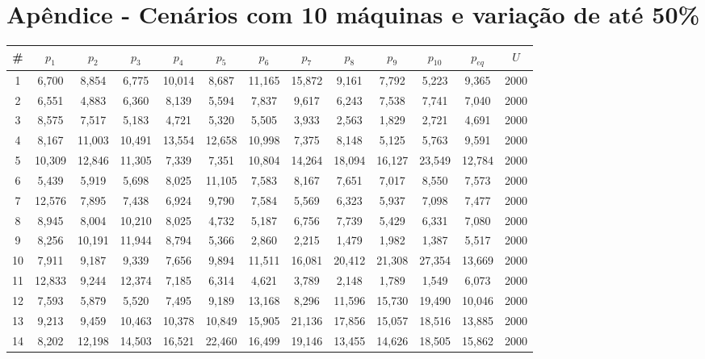 
\newpage
\section{Apêndice - Cenários com 10 máquinas e variação de até 50\%}\label{app:tab10machine50}
{\footnotesize\tabcolsep=3pt %
\begin{longtable}{ >{\footnotesize}ccccccccccccc}
\hline
\#  & $p_1$     & $p_2$     & $p_3$     & $p_4$     & $p_5$     & $p_6$     & $p_7$     & $p_8$     & $p_9$     & $p_{10}$    & $p_{eq}$    & $U$    \\ \hline
1   & 6,700  & 8,854  & 6,775  & 10,014 & 8,687  & 11,165 & 15,872 & 9,161  & 7,792  & 5,223  & 9,365  & 2000 \\
2   & 6,551  & 4,883  & 6,360  & 8,139  & 5,594  & 7,837  & 9,617  & 6,243  & 7,538  & 7,741  & 7,040  & 2000 \\
3   & 8,575  & 7,517  & 5,183  & 4,721  & 5,320  & 5,505  & 3,933  & 2,563  & 1,829  & 2,721  & 4,691  & 2000 \\
4   & 8,167  & 11,003 & 10,491 & 13,554 & 12,658 & 10,998 & 7,375  & 8,148  & 5,125  & 5,763  & 9,591  & 2000 \\
5   & 10,309 & 12,846 & 11,305 & 7,339  & 7,351  & 10,804 & 14,264 & 18,094 & 16,127 & 23,549 & 12,784 & 2000 \\
6   & 5,439  & 5,919  & 5,698  & 8,025  & 11,105 & 7,583  & 8,167  & 7,651  & 7,017  & 8,550  & 7,573  & 2000 \\
7   & 12,576 & 7,895  & 7,438  & 6,924  & 9,790  & 7,584  & 5,569  & 6,323  & 5,937  & 7,098  & 7,477  & 2000 \\
8   & 8,945  & 8,004  & 10,210 & 8,025  & 4,732  & 5,187  & 6,756  & 7,739  & 5,429  & 6,331  & 7,080  & 2000 \\
9   & 8,256  & 10,191 & 11,944 & 8,794  & 5,366  & 2,860  & 2,215  & 1,479  & 1,982  & 1,387  & 5,517  & 2000 \\
10  & 7,911  & 9,187  & 9,339  & 7,656  & 9,894  & 11,511 & 16,081 & 20,412 & 21,308 & 27,354 & 13,669 & 2000 \\
11  & 12,833 & 9,244  & 12,374 & 7,185  & 6,314  & 4,621  & 3,789  & 2,148  & 1,789  & 1,549  & 6,073  & 2000 \\
12  & 7,593  & 5,879  & 5,520  & 7,495  & 9,189  & 13,168 & 8,296  & 11,596 & 15,730 & 19,490 & 10,046 & 2000 \\
13  & 9,213  & 9,459  & 10,463 & 10,378 & 10,849 & 15,905 & 21,136 & 17,856 & 15,057 & 18,516 & 13,885 & 2000 \\
14  & 8,202  & 12,198 & 14,503 & 16,521 & 22,460 & 16,499 & 19,146 & 13,455 & 14,626 & 18,505 & 15,862 & 2000 \\

\end{longtable}}
